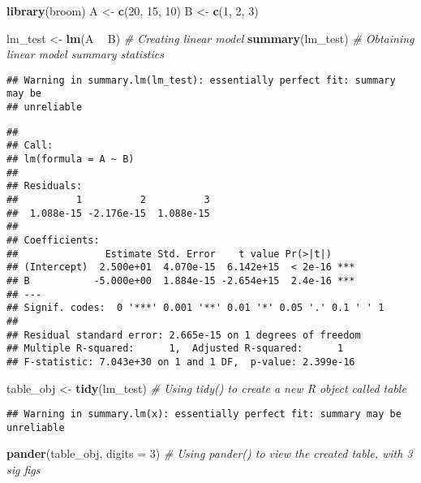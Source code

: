 \documentclass[]{article}
\newenvironment{Shaded}{\begin{snugshade}}{\end{snugshade}}
\newcommand{\CommentTok}[1]{\textcolor[rgb]{0.56,0.35,0.01}{\textit{#1}}}
\newcommand{\DataTypeTok}[1]{\textcolor[rgb]{0.13,0.29,0.53}{#1}}
\newcommand{\DecValTok}[1]{\textcolor[rgb]{0.00,0.00,0.81}{#1}}
\newcommand{\KeywordTok}[1]{\textcolor[rgb]{0.13,0.29,0.53}{\textbf{#1}}}
\newcommand{\NormalTok}[1]{#1}
\newcommand{\OperatorTok}[1]{\textcolor[rgb]{0.81,0.36,0.00}{\textbf{#1}}}
\newcommand{\StringTok}[1]{\textcolor[rgb]{0.31,0.60,0.02}{#1}}
\begin{document}
\begin{Shaded}
\begin{Highlighting}[]
\KeywordTok{library}\NormalTok{(broom)}
\NormalTok{A <-}\StringTok{ }\KeywordTok{c}\NormalTok{(}\DecValTok{20}\NormalTok{, }\DecValTok{15}\NormalTok{, }\DecValTok{10}\NormalTok{)}
\NormalTok{B <-}\StringTok{ }\KeywordTok{c}\NormalTok{(}\DecValTok{1}\NormalTok{, }\DecValTok{2}\NormalTok{, }\DecValTok{3}\NormalTok{)}

\NormalTok{lm_test <-}\StringTok{ }\KeywordTok{lm}\NormalTok{(A }\OperatorTok{~}\StringTok{ }\NormalTok{B)            }\CommentTok{# Creating linear model }
\KeywordTok{summary}\NormalTok{(lm_test)                }\CommentTok{# Obtaining linear model summary statistics}
\end{Highlighting}
\end{Shaded}

\begin{verbatim}
## Warning in summary.lm(lm_test): essentially perfect fit: summary may be
## unreliable
\end{verbatim}

\begin{verbatim}
## 
## Call:
## lm(formula = A ~ B)
## 
## Residuals:
##          1          2          3 
##  1.088e-15 -2.176e-15  1.088e-15 
## 
## Coefficients:
##               Estimate Std. Error    t value Pr(>|t|)    
## (Intercept)  2.500e+01  4.070e-15  6.142e+15  < 2e-16 ***
## B           -5.000e+00  1.884e-15 -2.654e+15  2.4e-16 ***
## ---
## Signif. codes:  0 '***' 0.001 '**' 0.01 '*' 0.05 '.' 0.1 ' ' 1
## 
## Residual standard error: 2.665e-15 on 1 degrees of freedom
## Multiple R-squared:      1,  Adjusted R-squared:      1 
## F-statistic: 7.043e+30 on 1 and 1 DF,  p-value: 2.399e-16
\end{verbatim}

\begin{Shaded}
\begin{Highlighting}[]
\NormalTok{table_obj <-}\StringTok{ }\KeywordTok{tidy}\NormalTok{(lm_test)      }\CommentTok{# Using tidy() to create a new R object called table }
\end{Highlighting}
\end{Shaded}

\begin{verbatim}
## Warning in summary.lm(x): essentially perfect fit: summary may be unreliable
\end{verbatim}

\begin{Shaded}
\begin{Highlighting}[]
\KeywordTok{pander}\NormalTok{(table_obj, }\DataTypeTok{digits =} \DecValTok{3}\NormalTok{)   }\CommentTok{# Using pander() to view the created table, with 3 sig figs }
\end{Highlighting}
\end{Shaded}
\end{document}
